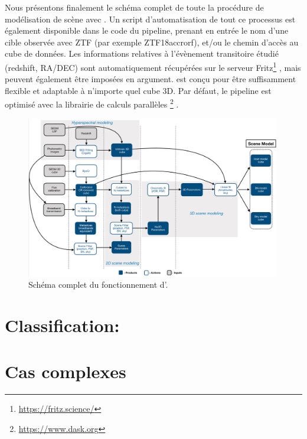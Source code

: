 \documentclass[../main/main.tex]{subfiles}
\begin{document}
Nous présentons finalement le schéma complet de toute la procédure de
modélisation de scène avec \hypergal. Un script d'automatisation de tout
ce processus est également disponible dans le code du pipeline, prenant
en entrée le nom d'une cible observée avec ZTF (par exemple
ZTF18accrorf), et/ou le chemin d'accès au cube de données. Les
informations relatives à l'évènement transitoire étudié (redshift, RA/DEC) sont
automatiquement récupérées sur le serveur
Fritz\footnote{\url{https://fritz.science/}} \citep{skyportal2019,
  duev2019real, Kasliwal_2019, Duev2021}, mais peuvent également être
imposées en argument. \hypergal est conçu pour être suffisamment
flexible et adaptable à n'importe quel cube 3D.
Par défaut, le pipeline est optimisé avec la librairie de calculs
parallèles \footnote{\url{https://www.dask.org}} \citep{Dask}.

\begin{figure}
  \centering
  \includegraphics[width=0.99\textwidth]{../figures/07_scene/Fulldaghypergal.pdf}
  \caption{Schéma complet du fonctionnement d'\hypergal.}
  \label{fig:fulldag}
\end{figure}

\section{Classification: }

\section{Cas complexes}




\end{document}
